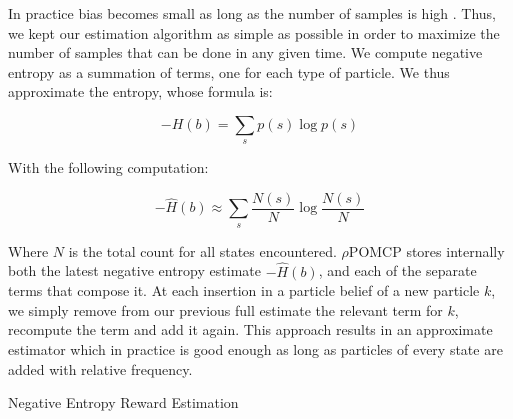 In practice bias becomes small as long as the number of samples is high \cite{cit:badentropy}. Thus,
we kept our estimation algorithm as simple as possible in order to maximize the number of samples
that can be done in any given time. We compute negative entropy as a summation of terms, one for
each type of particle. We thus approximate the entropy, whose formula is:

\[ -H(b) = \sum_s p(s) \log p(s) \]

With the following computation:

\[ -\hat{H}(b) \approx \sum_s \frac{N(s)}{N} \log \frac{N(s)}{N} \]

Where $N$ is the total count for all states encountered. $\rho$POMCP stores internally both the
latest negative entropy estimate $-\hat{H}(b)$, and each of the separate terms that compose it. At each
insertion in a particle belief of a new particle $k$, we simply remove from our previous full estimate the
relevant term for $k$, recompute the term and add it again. This approach results in an approximate
estimator which in practice is good enough as long as particles of every state are added with relative frequency.

\begin{algorithm}[H]
    \caption{Negative Entropy Reward Estimation}


\end{algorithm}
%

%


